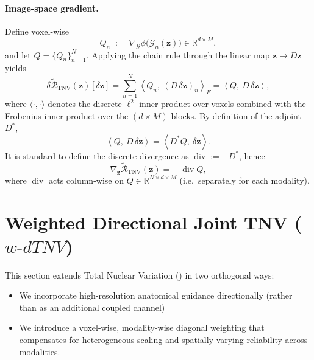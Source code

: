 \paragraph{Image-space gradient.}
Define voxel-wise
\begin{equation}
Q_n \;:=\; \nabla_{\mathcal{G}} \phi\bigl(\mathcal{G}_n(\bm{z})\bigr)
\in\mathbb{R}^{d\times M},
\end{equation}
and let $Q=\{Q_n\}_{n=1}^N$. Applying the chain rule through the linear map $\bm{z}\mapsto D\bm{z}$ yields
\begin{equation}
\delta \tilde{\mathcal{R}}_{\mathrm{TNV}}(\bm{z})[\delta \bm{z}]
=
\sum_{n=1}^N \left\langle Q_n,\ (D\,\delta \bm{z})_n \right\rangle_F
=
\left\langle Q,\ D\,\delta \bm{z} \right\rangle,
\end{equation}
where $\langle\cdot,\cdot\rangle$ denotes the discrete $\ell^2$ inner product over voxels combined with the Frobenius inner product over the $(d\times M)$ blocks. By definition of the adjoint $D^\ast$,
\begin{equation}
\left\langle Q,\ D\,\delta \bm{z} \right\rangle
=
\left\langle D^\ast Q,\ \delta \bm{z} \right\rangle.
\end{equation}
It is standard to define the discrete divergence as $\operatorname{div}:=-D^\ast$, hence
\begin{equation}
\nabla_{\bm{z}} \tilde{\mathcal{R}}_{\mathrm{TNV}}(\bm{z})
=
-\,\operatorname{div} Q,
\end{equation}
where $\operatorname{div}$ acts column-wise on $Q\in\mathbb{R}^{N\times d\times M}$ (i.e.\ separately for each modality).

\section{Weighted Directional Joint TNV ($w\text{-}dTNV$)}
\label{sec:wdjtnv}

This section extends Total Nuclear Variation (\wtnv) \cite{rigie_joint_2015, holt_total_2014} in two orthogonal ways:
\begin{itemize}
    \item We incorporate high-resolution anatomical guidance directionally (rather than as an additional coupled channel)
    \item We introduce a voxel-wise, modality-wise diagonal weighting that compensates for heterogeneous scaling and spatially varying reliability across modalities.
\end{itemize}

